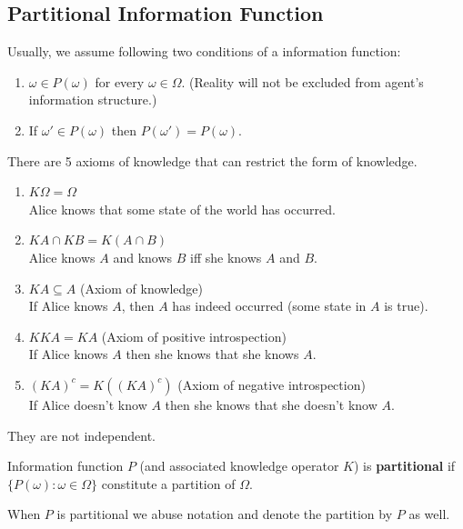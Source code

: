 \documentclass[11pt]{elegantbook}
\begin{document}
\subsection{Partitional Information Function}
\begin{definition}
    \normalfont
    Usually, we assume following two conditions of a information function:
    \begin{enumerate}[P1.]
        \item $\omega\in P(\omega)$ for every $\omega\in\Omega$. (Reality will not be excluded from agent's information structure.)
        \item If $\omega'\in P(\omega)$ then $P(\omega')=P(\omega)$.
    \end{enumerate}
\end{definition}

\begin{definition}
    \normalfont
    There are 5 axioms of knowledge that can restrict the form of knowledge.
    \begin{enumerate}
        \item $K \Omega=\Omega$\\ Alice knows that some state of the world has occurred.
        \item $K A \cap K B=K(A \cap B)$\\ Alice knows $A$ and knows $B$ iff she knows $A$ and $B$.
        \item $K A \subseteq A$ (Axiom of knowledge)\\ If Alice knows $A$, then $A$ has indeed occurred (some state in $A$ is true).
        \item $K K A=K A$ (Axiom of positive introspection)\\ If Alice knows $A$ then she knows that she knows $A$.
        \item $(K A)^c=K\left((K A)^c\right)$ (Axiom of negative introspection)\\ If Alice doesn't know $A$ then she knows that she doesn't know $A$.
    \end{enumerate}
    They are not independent.
\end{definition}

\begin{definition}[Partitional]
    \normalfont
    Information function $P$ (and associated knowledge operator $K$) is \textbf{partitional}
    if $\{P(\omega) : \omega \in \Omega\}$ constitute a partition of $\Omega$.
\end{definition}
When $P$ is partitional we abuse notation and denote the partition by $P$ as well.
\end{document}
